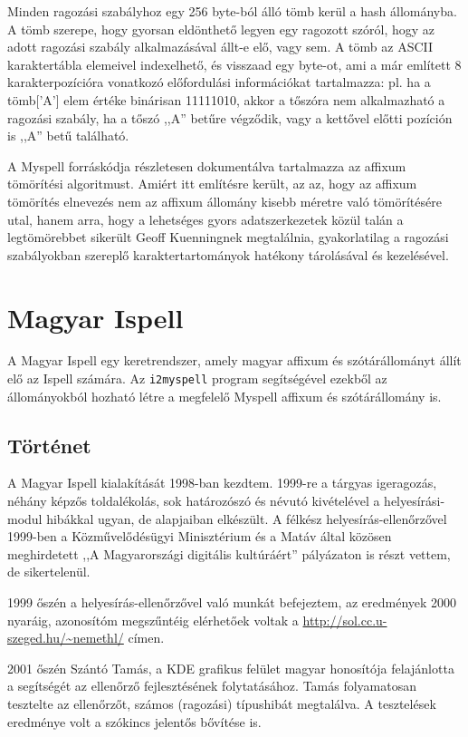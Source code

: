 Minden ragozási szabályhoz egy 256 byte-ból álló
tömb kerül a hash állományba. A tömb szerepe, hogy
gyorsan eldönthető legyen egy ragozott szóról, hogy
az adott ragozási szabály alkalmazásával állt-e elő,
vagy sem. A tömb az ASCII karaktertábla elemeivel
indexelhető, és visszaad egy byte-ot, ami a már említett
8 karakterpozícióra vonatkozó előfordulási információkat
tartalmazza: pl. ha a tömb['A'] elem értéke binárisan
11111010, akkor a tőszóra nem alkalmazható
a ragozási szabály, ha a tőszó ,,A'' betűre végződik,
vagy a kettővel előtti pozíción is ,,A'' betű található.

A Myspell forráskódja részletesen dokumentálva tartalmazza
az affixum tömörítési algoritmust. Amiért itt említésre került,
az az, hogy az affixum tömörítés elnevezés nem
az affixum állomány kisebb méretre való tömörítésére utal,
hanem arra, hogy a lehetséges gyors adatszerkezetek
közül talán a legtömörebbet sikerült Geoff Kuenningnek
megtalálnia, gyakorlatilag a ragozási szabályokban szereplő
karaktertartományok hatékony tárolásával és kezelésével.

\section{Magyar Ispell}

A Magyar Ispell egy keretrendszer, amely magyar
affixum és szótárállományt állít elő az Ispell számára.
Az \texttt{i2myspell} program segítségével ezekből
az állományokból hozható létre a megfelelő Myspell affixum
és szótárállomány is.

\subsection{Történet}

A Magyar Ispell kialakítását 1998-ban kezdtem. 1999-re
a tárgyas igeragozás, néhány képzős toldalékolás, sok
határozószó és névutó kivételével a helyesírási-modul
hibákkal ugyan, de alapjaiban elkészült. A félkész
helyesírás-ellenőrzővel 1999-ben a Közművelődésügyi
Minisztérium és a Matáv által közösen
meghirdetett ,,A Magyarországi digitális kultúráért''
pályázaton is részt vettem, de sikertelenül.

1999 őszén a helyesírás-ellenőrzővel való munkát befejeztem,
az eredmények 2000 nyaráig, azonosítóm megszűntéig elérhetőek
voltak a \url{http://sol.cc.u-szeged.hu/~nemethl/} címen.

2001 őszén Szántó Tamás, a KDE grafikus felület magyar
honosítója felajánlotta a segítségét az ellenőrző
fejlesztésének folytatásához. Tamás folyamatosan tesztelte
az ellenőrzőt, számos (ragozási) típushibát megtalálva.
A tesztelések eredménye volt a szókincs jelentős bővítése is.

